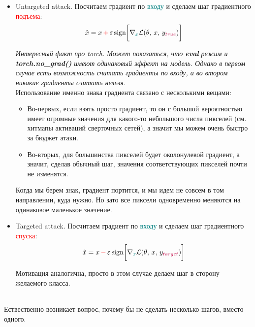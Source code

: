 \documentclass[12pt]{article}
\theoremstyle{definition} %
\theoremstyle{plain} %
\theoremstyle{remark} %
\begin{document}
\begin{itemize}
    \item Untargeted attack. Посчитаем градиент по \textcolor{teal}{входу} и сделаем шаг градиентного \textcolor{red}{подъема}:
    \[
    \hat{x} = x \,\textcolor{red}{ + }\, \varepsilon \, \text{sign} \bigg[\nabla_{\textcolor{teal}{x}} \mathcal{L}(\theta, \, x, \, y_{\textcolor{purple}{true}})\bigg]
    \]

    \textit{Интересный факт про torch. Может показаться, что \textbf{eval} режим и \textbf{torch.no\_grad()} имеют одинаковый эффект на модель. Однако в первом случае есть возможность считать градиенты по входу, а во втором никакие градиенты считать нельзя.} \\

    Использование именно знака градиента связано с несколькими вещами:
    \begin{itemize}
        \item Во-первых, если взять просто градиент, то он с большой вероятностью имеет огромные значения для какого-то небольшого числа пикселей (см. хитмапы активаций сверточных сетей), а значит мы можем очень быстро за бюджет атаки.
        \item Во-вторых, для большинства пикселей будет околонулевой градиент, а значит, сделав обычный шаг, значения соответствующих пикселей почти не изменятся. 
    \end{itemize}

    Когда мы берем знак, градиент портится, и мы идем не совсем в том направлении, куда нужно. Но зато все пиксели одновременно меняются на одинаковое маленькое значение.

    \item Targeted attack. Посчитаем градиент по \textcolor{teal}{входу} и сделаем шаг градиентного \textcolor{red}{спуска}:
    \[
    \hat{x} = x \,\textcolor{red}{ - }\, \varepsilon \, \text{sign} \bigg[\nabla_{\textcolor{teal}{x}} \mathcal{L}(\theta, \, x, \, y_{\textcolor{purple}{{target}}})\bigg]
    \]

    Мотивация аналогична, просто в этом случае делаем шаг в сторону желаемого класса.
\end{itemize}

 \\

Ествественно возникает вопрос, почему бы не сделать несколько шагов, вместо одного.\\
\end{document}

